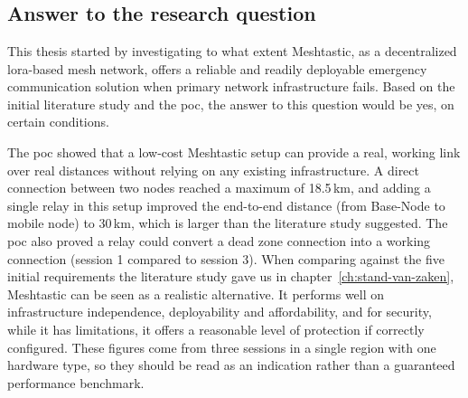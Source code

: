 
\chapter{}%
\label{ch:conclusie}

\section{Answer to the research question}%
\label{sec:conclusion-answer}

This thesis started by investigating to what extent Meshtastic, as a decentralized \gls{lora}-based mesh network, offers a reliable and readily deployable emergency communication solution when primary network infrastructure fails.
Based on the initial literature study and the \gls{poc}, the answer to this question would be yes, on certain conditions.

The \gls{poc} showed that a low-cost Meshtastic setup can provide a real, working link over real distances without relying on any existing infrastructure. A direct connection between two nodes reached a maximum of 18.5\,km, and adding a single relay in this setup improved the end-to-end distance (from Base-Node to mobile node) to 30\,km, which is larger than the literature study suggested.
The \gls{poc} also proved a relay could convert a dead zone connection into a working connection (session 1 compared to session 3). When comparing against the five initial requirements the literature study gave us in chapter~\ref{ch:stand-van-zaken}, Meshtastic can be seen as a realistic alternative.
It performs well on infrastructure independence, deployability and affordability, and for security, while it has limitations, it offers a reasonable level of protection if correctly configured.
These figures come from three sessions in a single region with one hardware type, so they should be read as an indication rather than a guaranteed performance benchmark.

